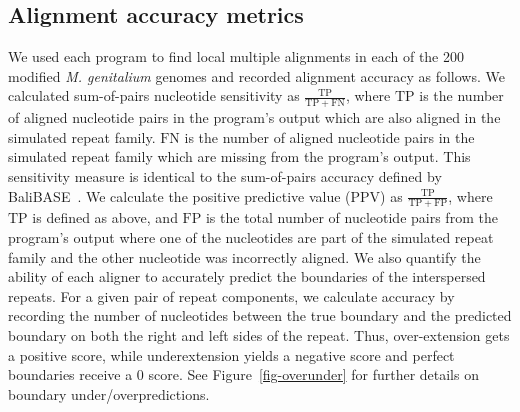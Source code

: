 \documentclass[10pt,journal,letterpaper,compsoc,peerreview]{IEEEtran}
\begin{document}
\subsection{Alignment accuracy metrics}
\label{sec:metrics}
We used each program to find local multiple alignments in each of the
200 modified \emph{M. genitalium} genomes and recorded alignment
accuracy as follows. We calculated sum-of-pairs nucleotide sensitivity
as $\frac{\mathrm{TP}}{\mathrm{TP} + \mathrm{FN}}$, where
$\mathrm{TP}$ is the number of aligned nucleotide pairs in the
program's output which are also aligned in the simulated repeat
family.  $\mathrm{FN}$ is the number of aligned nucleotide pairs in
the simulated repeat family which are missing from the program's
output.  This sensitivity measure is identical to the sum-of-pairs
accuracy defined by BaliBASE~\cite{ref-balibase}.  We calculate the
positive predictive value (PPV) as $\frac{\mathrm{TP}}{\mathrm{TP} +
\mathrm{FP}}$, where $\mathrm{TP}$ is defined as above, and
$\mathrm{FP}$ is the total number of nucleotide pairs from the
program's output where one of the nucleotides are part of the
simulated repeat family and the other nucleotide was incorrectly
aligned. We also quantify the ability of each aligner to accurately predict the
boundaries of the interspersed repeats.  For a given pair of repeat components, we calculate accuracy by recording the number of nucleotides between the true boundary and the predicted boundary
on both the right and left sides of the repeat.  Thus, over-extension gets a positive score, while underextension
yields a negative score and perfect boundaries receive a 0 score. See Figure~\ref{fig-overunder} for
further details on boundary under/overpredictions.
\end{document}
